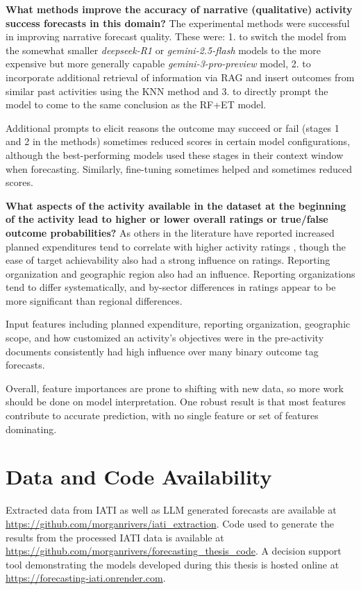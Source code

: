 \documentclass[12pt,a4paper]{article}
\let\citep\parencite
\begin{document}
\textbf{What methods improve the accuracy of narrative (qualitative) activity success forecasts in this domain?}
The experimental methods were successful in improving narrative forecast quality. These were: 1. to switch the model from the somewhat smaller \emph{deepseek-R1} or \emph{gemini-2.5-flash} models to the more expensive but more generally capable \emph{gemini-3-pro-preview} model,  2. to incorporate additional retrieval of information via RAG and insert outcomes from similar past activities using the KNN method and 3. to directly prompt the model to come to the same conclusion as the RF+ET model.

Additional prompts to elicit reasons the outcome may succeed or fail (stages 1 and 2 in the methods) sometimes reduced scores in certain model configurations, although the best-performing models used these stages in their context window when forecasting. Similarly, fine-tuning sometimes helped and sometimes reduced scores.

\textbf{What aspects of the activity available in the dataset at the beginning of the activity lead to higher or lower overall ratings or true/false outcome probabilities?}
As others in the literature have reported increased planned expenditures tend to correlate with higher activity ratings \citep{vivaltHowMuchCan2020} \citep{ashtonPuzzleMissingPieces2023} \citep{eilersVolumeRiskComplexitya}, though the ease of target achievability also had a strong influence on ratings. Reporting organization and geographic region also had an influence. Reporting organizations tend to differ systematically, and by-sector differences in ratings appear to be more significant than regional differences.

Input features including planned expenditure, reporting organization, geographic scope, and how customized an activity's objectives were in the pre-activity documents consistently had high influence over many binary outcome tag forecasts. 

Overall, feature importances are prone to shifting with new data, so more work should be done on model interpretation. One robust result is that most features contribute to accurate prediction, with no single feature or set of features dominating.

\section*{Data and Code Availability}
Extracted data from IATI as well as LLM generated forecasts are available at \url{https://github.com/morganrivers/iati_extraction}. Code used to generate the results from the processed IATI data is available at \url{https://github.com/morganrivers/forecasting_thesis_code}. A decision support tool demonstrating the models developed during this thesis is hosted online at \url{https://forecasting-iati.onrender.com}.
\end{document}
